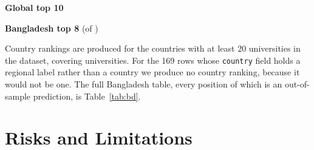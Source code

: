 \documentclass[11pt,a4paper]{article}
\begin{document}
\begin{table}[H]\centering\small
\caption{Global and national leaders.}
\begin{minipage}[t]{0.55\textwidth}\centering
\textbf{Global top 10}\\[3pt]

\end{minipage}%
\begin{minipage}[t]{0.45\textwidth}\centering
\textbf{Bangladesh top 8} (of \nBD{})\\[3pt]

\end{minipage}
\end{table}

\noindent Country rankings are produced for the \nCountries{} countries with at least 20 universities
in the dataset, covering \nCountryRanked{} universities. For the 169 rows whose \texttt{country} field
holds a regional label rather than a country we produce no country ranking, because it would not be
one. The full Bangladesh table, every position of which is an out-of-sample prediction, is
Table~\ref{tab:bd}.

\section{Risks and Limitations}
\label{sec:limitations}
\end{document}
